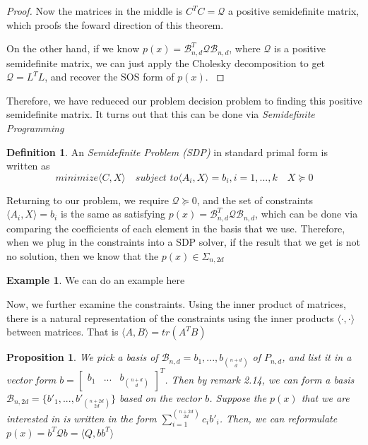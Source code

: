 \documentclass[12pt]{amsart}
\numberwithin{equation}{section}
\newtheorem{prop}[thm]{Proposition}
\theoremstyle{definition}
\newtheorem{definition}[thm]{Definition}
\newtheorem{example}[thm]{Example}
\numberwithin{thm}{section}
\begin{document}
\begin{proof}
     Now the matrices in the middle is $C^T C = \mathcal{Q}$ a positive semidefinite matrix, which proofs the foward direction of this theorem.

     On the other hand, if we know $p(x) = \mathcal{B}_{n, d}^T \mathcal{Q} \mathcal{B}_{n, d}$, where $\mathcal{Q}$ is a positive semidefinite matrix, we can just apply the Cholesky decomposition to get $\mathcal{Q} = L^T L$, and recover the SOS form of $p(x)$. \cite{Blekherman:Parrilo:Thomas}
\end{proof}

Therefore, we have redueced our problem decision problem to finding this positive semidefinite matrix. It turns out that this can be done via \emph{Semidefinite Programming} \cite{Blekherman:Parrilo:Thomas}
\begin{definition}
     An \emph{Semidefinite Problem (SDP)} in standard primal form is written as
     \begin{equation}
          \textit{minimize} \langle C, X \rangle \quad \textit{subject to} \langle A_i, X \rangle = b_i, i=1,...,k \quad X \succcurlyeq 0
     \end{equation}
\end{definition}

Returning to our problem, we require $\mathcal{Q} \succcurlyeq 0$, and the set of constraints $ \langle A_i, X \rangle = b_i$ is the same as satisfying $p(x) = \mathcal{B}_{n, d}^T \mathcal{Q} \mathcal{B}_{n, d}$, which can be done via comparing the coefficients of each element in the basis that we use. \cite{Recher:Masterthesis} 
Therefore, when we plug in the constraints into a SDP solver, if the result that we get is not no solution, then we know that the $p(x) \in \Sigma_{n, 2d}$

\begin{example}
     We can do an example here
\end{example}

Now, we further examine the constraints. Using the inner product of matrices, there is a natural representation of the constraints using the inner products $\langle \cdot,  \cdot \rangle$ between matrices. That is $\langle A, B \rangle = tr(A^T B)$ 

\begin{prop}

     We pick a basis of $\mathcal{B}_{n, d} = {b_1, ..., b_{n + d \choose d}}$ of $P_{n, d}$, and list it in a vector form $ b =\begin{bmatrix}
          b_1 &
          ... &
          b_{ n+ d \choose d}
     \end{bmatrix} ^ T$. Then by remark 2.14, we can form a basis $\mathcal{B}_{n, 2d} = \{b'_1, ..., b'_{n + 2d \choose 2d}\}$ based on the vector $b$. 
     Suppose the $p(x)$ that we are interested in is written in the form $\sum_{i = 1}^{n + 2d \choose 2d } c_i b'_i$.
     Then, we can reformulate $p(x) = b^T \mathcal{Q} b = \langle Q, b b^T \rangle$ 
\end{prop}
\end{document}
